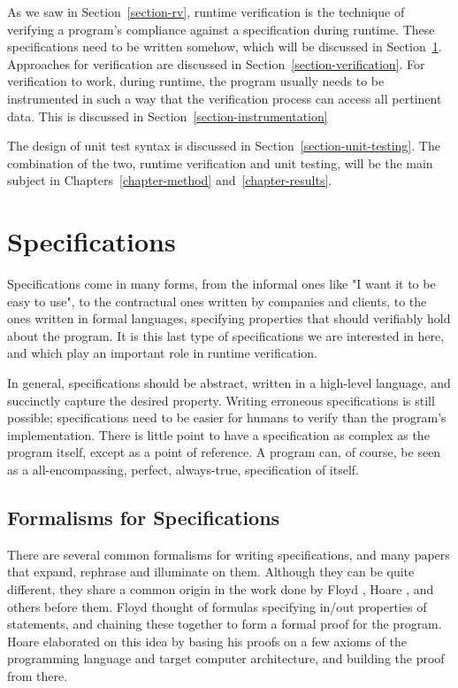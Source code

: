 \documentclass[a4paper,11pt]{kth-mag}
\begin{document}
As we saw in Section~\ref{section-rv}, runtime verification is the technique of
verifying a program's compliance against a specification during runtime. These
specifications need to be written somehow, which will be discussed in
Section~\ref{section-specifications}. Approaches for verification are discussed
in Section~\ref{section-verification}. For verification to work, during
runtime,
the program usually needs to be instrumented in such a way that the
verification process can access all pertinent data. This is discussed in
Section~\ref{section-instrumentation}

The design of unit test syntax is discussed in
Section~\ref{section-unit-testing}. The combination of the two, runtime
verification and unit testing, will be the main subject in
Chapters~\ref{chapter-method} and~\ref{chapter-results}.


\section{Specifications} \label{section-specifications}

Specifications come in many forms, from the informal ones like "I want it to be
easy to use", to the contractual ones written by companies and clients, to the
ones written in formal languages, specifying properties that should verifiably
hold about the program. It is this last type of specifications we are
interested in here, and which play an important role in runtime verification.

In general, specifications should be abstract, written in a high-level
language, and succinctly capture the desired property. Writing erroneous
specifications is still possible; specifications need to be easier for humans
to verify than the program's implementation. There is little point to have a
specification as complex as the program itself, except as a point of reference.
A program can, of course, be seen as a all-encompassing, perfect, always-true,
specification of itself.


\subsection{Formalisms for Specifications}

There are several common formalisms for writing specifications, and many papers
that expand, rephrase and illuminate on them. Although they can be quite
different, they share a common origin in the work done by Floyd \cite{floyd67},
Hoare \cite{hoare69}, and others before them.  Floyd thought of formulas
specifying in/out properties of statements, and chaining these together to form
a formal proof for the program. Hoare elaborated on this idea by basing his
proofs on a few axioms of the programming language and target computer
architecture, and building the proof from there.
\end{document}
